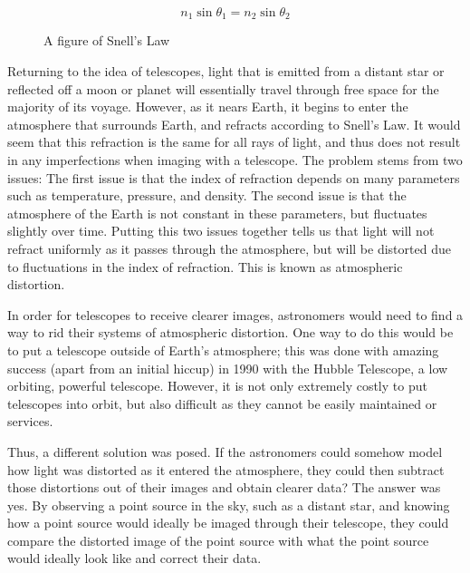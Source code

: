 \begin{equation}
  n_1 \sin \theta_1 = n_2 \sin \theta_2
  \label{snellslaw}
\end{equation}



\begin{figure}
  \center
{}
\caption{A figure of Snell's Law}
\label{snellsfigure}
\end{figure}
Returning to the idea of telescopes, light that is emitted from a distant star or reflected off a moon or planet will essentially travel through free space for the majority of its voyage. However, as it nears Earth, it begins to enter the atmosphere that surrounds Earth, and refracts according to Snell's Law. It would seem that this refraction is the same for all rays of light, and thus does not result in any imperfections when imaging with a telescope. The problem stems from two issues: The first issue is that the index of refraction depends on many parameters such as temperature, pressure, and density. The second issue is that the atmosphere of the Earth is not constant in these parameters, but fluctuates slightly over time. Putting this two issues together tells us that light will not refract uniformly as it passes through the atmosphere, but will be distorted due to fluctuations in the index of refraction. This is known as atmospheric distortion.


In order for telescopes to receive clearer images, astronomers would need to find a way to rid their systems of atmospheric distortion. One way to do this would be to put a telescope outside of Earth's atmosphere; this was done with amazing success (apart from an initial hiccup) in 1990 with the Hubble Telescope, a low orbiting, powerful telescope. However, it is not only extremely costly to put telescopes into orbit, but also difficult as they cannot be easily maintained or services.

Thus, a different solution was posed. If the astronomers could somehow model how light was distorted as it entered the atmosphere, they could then subtract those distortions out of their images and obtain clearer data? The answer was yes. By observing a point source in the sky, such as a distant star, and knowing how a point source would ideally be imaged through their telescope, they could compare the distorted image of the point source with what the point source would ideally look like and correct their data.

